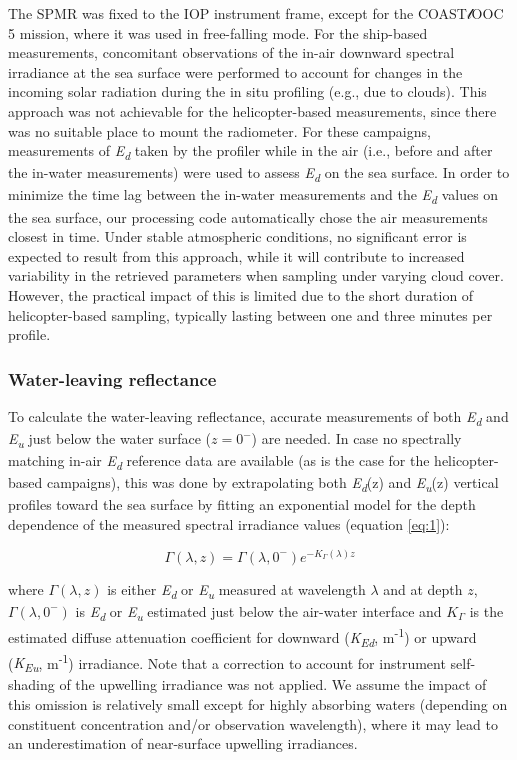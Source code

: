 \documentclass[essd, manuscript]{copernicus}
\begin{document}
The SPMR was fixed to the IOP instrument frame, except for the COAST$\mathscr{l}$OOC 5 mission, where it was used in free-falling mode. For the ship-based measurements, concomitant observations of the in-air downward spectral irradiance at the sea surface were performed to account for changes in the incoming solar radiation during the in situ profiling (e.g., due to clouds). This approach was not achievable for the helicopter-based measurements, since there was no suitable place to mount the radiometer. For these campaigns, measurements of \textit{E\textsubscript{d}} taken by the profiler while in the air (i.e., before and after the in-water measurements) were used to assess \textit{E\textsubscript{d}} on the sea surface. In order to minimize the time lag between the in-water measurements and the \textit{E\textsubscript{d}} values on the sea surface, our processing code automatically chose the air measurements closest in time. Under stable atmospheric conditions, no significant error is expected to result from this approach, while it will contribute to increased variability in the retrieved parameters when sampling under varying cloud cover. However, the practical impact of this is limited due to the short duration of helicopter-based sampling, typically lasting between one and three minutes per profile.

\subsubsection{Water-leaving reflectance}

To calculate the water-leaving reflectance, accurate measurements of both \textit{E\textsubscript{d}} and \textit{E\textsubscript{u}} just below the water surface ($z=0^-$) are needed. In case no spectrally matching in-air \textit{E\textsubscript{d}} reference data are available (as is the case for the helicopter-based campaigns), this was done by extrapolating both \textit{E\textsubscript{d}}(z) and \textit{E\textsubscript{u}}(z) vertical profiles toward the sea surface by fitting an exponential model for the depth dependence of the measured spectral irradiance values (equation \ref{eq:1}):

\begin{equation}
    \Gamma(\lambda, z) = \Gamma(\lambda, 0^-)e^{-K_\Gamma(\lambda)z}
    \label{eq:1}
\end{equation}

where $\Gamma(\lambda, z)$ is either \textit{E\textsubscript{d}} or \textit{E\textsubscript{u}} measured at wavelength $\lambda$ and at depth $z$, $\Gamma(\lambda, 0^-)$ is \textit{E\textsubscript{d}} or \textit{E\textsubscript{u}} estimated just below the air-water interface and $K_\Gamma$ is the estimated diffuse attenuation coefficient for downward (\textit{K\textsubscript{Ed}}, m\textsuperscript{-1}) or upward (\textit{K\textsubscript{Eu}}, m\textsuperscript{-1}) irradiance. Note that a correction to account for instrument self-shading of the upwelling irradiance was not applied. We assume the impact of this omission is relatively small except for highly absorbing waters (depending on constituent concentration and/or observation wavelength), where it may lead to an underestimation of near-surface upwelling irradiances.
\end{document}
